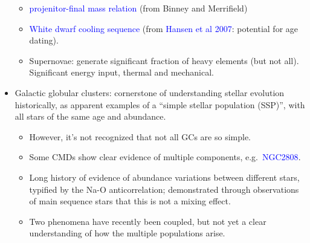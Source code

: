 \documentclass{article}
\begin{document}
\begin{itemize}
        \begin{itemize}
            \item \textcolor{blue}{projenitor-final mass relation}
                (from Binney and Merrifield)
            \item \textcolor{blue}{White dwarf cooling sequence}
                (from \textcolor{blue}{Hansen et al 2007}: potential for
                age dating).
            \item Supernovae: generate significant fraction of heavy elements
                (but not all). Significant energy input, thermal and mechanical.
        \end{itemize}
    \item Galactic globular clusters: cornerstone of understanding
      stellar evolution historically, as apparent examples of a
      ``simple stellar population (SSP)'', with all stars of the same
      age and abundance.
      \begin{itemize}
          \item However, it's not recognized that not all GCs are so simple.
          \item Some CMDs show clear evidence of multiple components, e.g.\
              \textcolor{blue}{NGC2808}.
          \item Long history of evidence of abundance variations between
              different stars, typified by the Na-O anticorrelation;
              demonstrated through observations of main sequence stars that
              this is not a mixing effect.
          \item Two phenomena have recently been coupled, but not yet a clear
              understanding of how the multiple populations arise.
      \end{itemize}
  \end{itemize}
\end{document}
